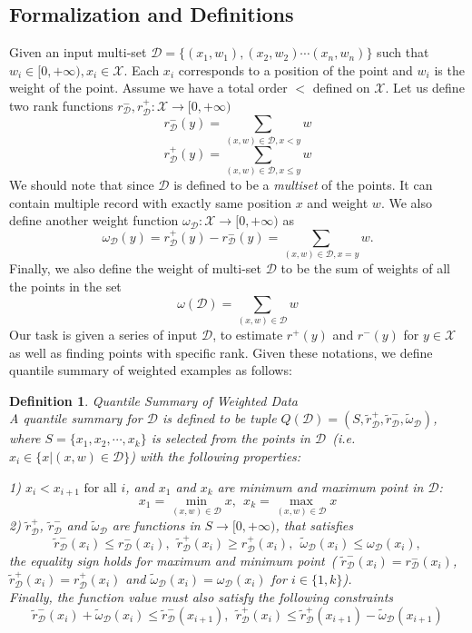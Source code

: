 \documentclass{sig-alternate-05-2015}
\newcommand{\Rplus}{[0, +\infty)}
\newcommand{\w}{\omega}
\newcommand{\sX}{\mathcal{X}}
\newcommand{\sD}{\mathcal{D}}
\newcommand{\tdr}{\tilde{r}_{\sD}}
\newcommand{\tdw}{\tilde{\omega}_{\sD}}
\newtheorem{thm:def}{Definition}[section]
\begin{document}
\subsection{Formalization and Definitions}
Given an input multi-set $\sD=\{(x_1,w_1), (x_2,w_2) \cdots (x_n,w_n)\}$  such that $w_i\in \Rplus, x_i \in \sX$.
Each $x_i$ corresponds to a position of the point and $w_i$ is the weight of the point. Assume we have a total order $<$ defined on $\sX$.
 Let us define  two rank functions $r^-_{\sD}, r^+_{\sD}: \sX \rightarrow \Rplus$
\begin{equation}
    r^-_{\sD}(y) = \sum_{(x,w)\in \sD, x < y} w
\end{equation}
\begin{equation}
    r^+_{\sD}(y) = \sum_{(x,w)\in \sD, x \leq y} w
\end{equation}
We should note that since $\sD$ is defined to be a \emph{multiset} of the points. It can contain multiple record with exactly same position $x$ and weight $w$.
We also define another weight function $\w_{\sD}:  \sX \rightarrow \Rplus$ as
\begin{equation}
    \w_{\sD}(y) =  r^+_{\sD}(y)  - r^-_{\sD}(y) =  \sum_{(x,w)\in \sD, x = y} w .
\end{equation}
Finally, we also define the weight of multi-set $\sD$ to be  the sum of weights of all the points in the set
\begin{equation}
    \w(\sD) = \sum_{(x,w)\in \sD} w
\end{equation}
Our task is given a series of input $\sD$, to estimate $r^+(y)$ and $r^-(y)$ for $y\in \sX$ as well as finding points
with specific rank.
Given these notations, we define quantile summary of weighted examples as follows:

\begin{thm:def}\label{def:sketch}{Quantile Summary of Weighted Data}\\
A quantile summary for $\sD$ is defined to be tuple $Q(\sD) = (S, \tdr^+, \tdr^-, \tdw)$, where
$S = \{x_1, x_2,\cdots, x_k\}$ is selected from the points in $\sD$~(i.e. $x_i \in\{x|(x,w)\in \sD\}$) with the following properties:

1) $x_{i}< x_{i+1} \mbox{ for all } i$, and $x_1$ and $x_k$ are minimum and maximum point in $\sD$:
$$x_1 = \min_{(x,w)\in \sD} x,\ \  x_k = \max_{(x,w)\in \sD} x$$
2) $\tdr^+$, $\tdr^-$ and $\tdw$ are functions in $S\rightarrow \Rplus$, that satisfies
\begin{equation}\label{eq:constraint}
     \tdr^-(x_i) \leq r^-_{\sD}(x_i),\ \  \tdr^+(x_i) \geq r^+_{\sD}(x_i), \ \ \tdw(x_i)\leq \w_{\sD}(x_i),
\end{equation}
 the equality sign holds for maximum and minimum point~(
$ \tdr^-(x_i) = r^-_{\sD}(x_i)$, $\tdr^+(x_i) = r^+_{\sD}(x_i)$ and $\tdw(x_i)= \w_{\sD}(x_i) $ for $i\in \{1, k\}$). \\
Finally, the function value must also satisfy the following constraints
\begin{equation}
 \tdr^-(x_i) + \tdw(x_i)\leq \tdr^-(x_{i+1}), \ \ \tdr^+(x_i) \leq \tdr^+(x_{i+1}) - \tdw(x_{i+1})
\end{equation}
\end{thm:def}
\end{document}
